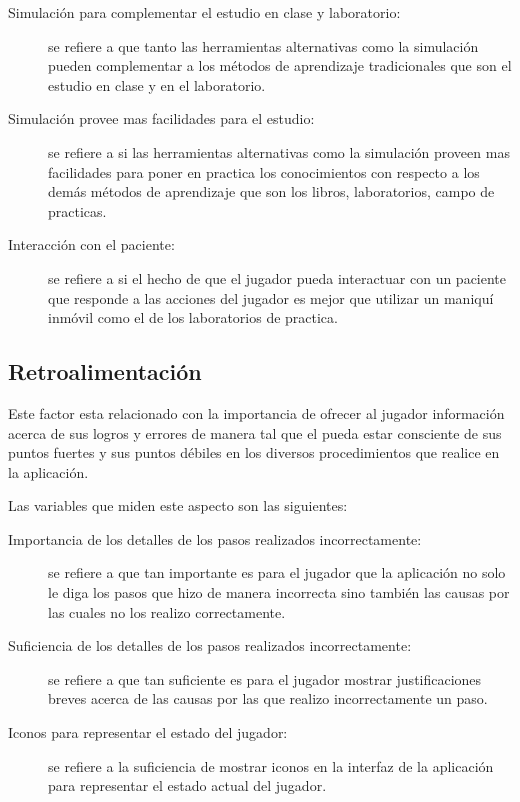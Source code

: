 \begin{description}

\item[Simulación para complementar el estudio en clase y laboratorio:] se
    refiere a que tanto las herramientas alternativas como la simulación pueden
    complementar a los métodos de aprendizaje tradicionales que son el estudio
    en clase y en el laboratorio.

\item[Simulación provee mas facilidades para el estudio:] se refiere a si las
    herramientas alternativas como la simulación proveen mas facilidades para
    poner en practica los conocimientos con respecto a los demás métodos de
    aprendizaje que son los libros, laboratorios,  campo de practicas.

\item[Interacción con el paciente:] se refiere a si el hecho de que el jugador
    pueda interactuar con un paciente que responde a las acciones del jugador es
    mejor que utilizar un maniquí inmóvil como el de los laboratorios de
    practica.

\end{description}

\subsection{Retroalimentación}

Este factor esta relacionado con la importancia de ofrecer al jugador
información acerca de sus logros y errores de manera tal que el pueda estar
consciente de sus puntos fuertes y sus puntos débiles en los diversos
procedimientos que realice en la aplicación.

Las variables que miden este aspecto son las siguientes:

\begin{description}

\item[Importancia de los detalles de los pasos realizados incorrectamente:] se
    refiere a que tan importante es para el jugador que la aplicación no solo le
    diga los pasos que hizo de manera incorrecta sino también las causas por las
    cuales no los realizo correctamente.

\item[Suficiencia de los detalles de los pasos realizados incorrectamente:]se
    refiere a que tan suficiente es para el jugador mostrar justificaciones
    breves acerca de las causas por las que realizo incorrectamente un paso.

\item[Iconos para representar el estado del jugador:] se refiere a la
    suficiencia de mostrar iconos en la interfaz de la aplicación para
    representar el estado actual del jugador.

\end{description}

